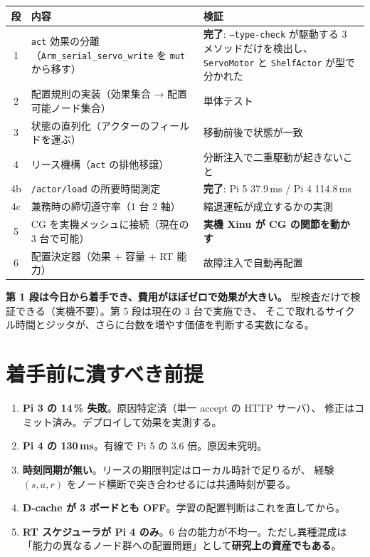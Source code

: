 \documentclass[11pt,a4paper]{article}
\newcommand{\code}[1]{\texttt{#1}}
\newcommand{\prob}[1]{\textbf{\textcolor{red!55!black}{#1}}}
\newcommand{\good}[1]{\textbf{\textcolor{green!45!black}{#1}}}
\begin{document}
\begin{center}\small
\begin{tabularx}{\textwidth}{@{}c X l@{}}
\toprule
\textbf{段} & \textbf{内容} & \textbf{検証}\\
\midrule
1 & \code{act} 効果の分離（\code{Arm\_serial\_servo\_write} を \code{mut} から移す） &
    \good{完了}: \code{--type-check} が駆動する 3 メソッドだけを検出し、
    \code{ServoMotor} と \code{ShelfActor} が型で分かれた\\
2 & 配置規則の実装（効果集合 → 配置可能ノード集合） & 単体テスト\\
3 & 状態の直列化（アクターのフィールドを運ぶ） & 移動前後で状態が一致\\
4 & リース機構（\code{act} の排他移譲） & 分断注入で二重駆動が起きないこと\\
4b & \code{/actor/load} の所要時間測定 & \good{完了}: Pi 5 37.9\,ms / Pi 4 114.8\,ms\\
4c & 兼務時の締切遵守率（1 台 2 軸） & 縮退運転が成立するかの実測\\
5 & CG を実機メッシュに接続（現在の 3 台で可能） & \textbf{実機 Xinu が CG の関節を動かす}\\
6 & 配置決定器（効果 + 容量 + RT 能力） & 故障注入で自動再配置\\
\bottomrule
\end{tabularx}
\end{center}

\textbf{第 1 段は今日から着手でき、費用がほぼゼロで効果が大きい。}
型検査だけで検証できる（実機不要）。第 5 段は現在の 3 台で実施でき、
そこで取れるサイクル時間とジッタが、さらに台数を増やす価値を判断する実数になる。

\section{着手前に潰すべき前提}

\begin{enumerate}[leftmargin=1.6em,itemsep=3pt]
\item \prob{Pi 3 の 14\,\% 失敗}。原因特定済（単一 accept の HTTP サーバ）、
      修正はコミット済み。デプロイして効果を実測する。
\item \prob{Pi 4 の 130\,ms}。有線で Pi 5 の 3.6 倍。原因未究明。
\item \prob{時刻同期が無い}。リースの期限判定はローカル時計で足りるが、
      経験 $(s,a,r)$ をノード横断で突き合わせるには共通時刻が要る。
\item \prob{D-cache が 3 ボードとも OFF}。学習の配置判断はこれを直してから。
\item \prob{RT スケジューラが Pi 4 のみ}。6 台の能力が不均一。ただし異種混成は
      「能力の異なるノード群への配置問題」として\textbf{研究上の資産でもある}。
\end{enumerate}
\end{document}
